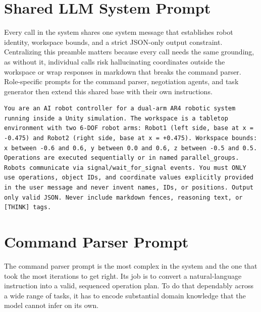 \documentclass[
     12pt,
     a4paper,
     BCOR=10mm,
     DIV=14,
     listof=totoc,
     bibliography=totoc,
     parskip,
     twoside,
     headsepline
     ]{scrreprt}
\begin{document}
\section{Shared LLM System Prompt}
Every call in the system shares one system message that establishes robot identity, workspace bounds, and a strict JSON-only output constraint. Centralizing this preamble matters because every call needs the same grounding, as without it, individual calls risk hallucinating coordinates outside the workspace or wrap responses in markdown that breaks the command parser. Role-specific prompts for the command parser, negotiation agents, and task generator then extend this shared base with their own instructions.

\begin{lstlisting}[caption={System Prompt that established robot identity, workspace bounds and JSON-only output constraint}, extendedchars=true]
You are an AI robot controller for a dual-arm AR4 robotic system running inside a Unity simulation. The workspace is a tabletop environment with two 6-DOF robot arms: Robot1 (left side, base at x = -0.475) and Robot2 (right side, base at x = +0.475). Workspace bounds: x between -0.6 and 0.6, y between 0.0 and 0.6, z between -0.5 and 0.5. Operations are executed sequentially or in named parallel_groups. Robots communicate via signal/wait_for_signal events. You must ONLY use operations, object IDs, and coordinate values explicitly provided in the user message and never invent names, IDs, or positions. Output only valid JSON. Never include markdown fences, reasoning text, or [THINK] tags.
\end{lstlisting}

\section{Command Parser Prompt}
The command parser prompt is the most complex in the system and the one that took the most iterations to get right. Its job is to convert a natural-language instruction into a valid, sequenced operation plan. To do that dependably across a wide range of tasks, it has to encode substantial domain knowledge that the model cannot infer on its own.
\end{document}
